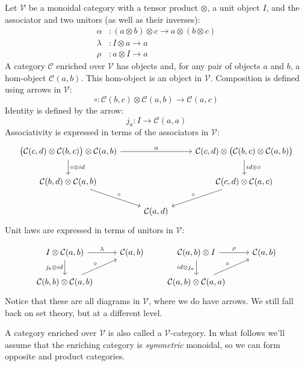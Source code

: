 \documentclass[DaoFP]{subfiles}
\begin{document}
Let $\mathcal V$ be a monoidal category with a tensor product $\otimes$, a unit object $I$, and the associator and two unitors (as well as their inverses):
\begin{align*}
\alpha &\colon (a \otimes b) \otimes c \to a \otimes (b \otimes c)
\\
 \lambda &\colon I \otimes a \to a
 \\
 \rho &\colon a \otimes I \to a
\end{align*}
A category $\mathcal C$ enriched over $\mathcal V$ has objects and, for any pair of objects $a$ and $b$, a hom-object $\mathcal C(a, b)$. This hom-object is an object in $\mathcal V$. Composition is defined using arrows in $\mathcal V$:
\[ \circ \colon \mathcal C (b, c) \otimes \mathcal C (a, b) \to \mathcal C (a, c) \]
Identity is defined by the arrow:
\[ j_a \colon I \to \mathcal C (a, a) \]
Associativity is expressed in terms of the associators in $\mathcal V$:
\[
 \begin{tikzcd}
 \big( \mathcal C (c, d) \otimes \mathcal C (b, c) \big) \otimes \mathcal C(a, b)
 \arrow[rr, "\alpha"]
 \arrow[d, "\circ \otimes id"]
 &&  \mathcal C (c, d) \otimes \big( \mathcal C (b, c) \otimes \mathcal C(a, b) \big) 
 \arrow[d, "id \otimes \circ"]
 \\
 \mathcal C(b, d) \otimes \mathcal C(a, b)
 \arrow[dr, "\circ"]
 && \mathcal C(c, d) \otimes \mathcal C(a, c)
 \arrow[dl, "\circ"']
 \\
 & \mathcal C(a, d)
 \end{tikzcd}
\]
Unit laws are expressed in terms of unitors in $\mathcal V$:

\[
 \begin{tikzcd}
 I \otimes \mathcal C(a, b)
 \arrow[r, "\lambda"]
 \arrow[d, "j_b \otimes id"']
 & \mathcal C(a, b)
 \\
 \mathcal C(b, b) \otimes \mathcal C(a, b)
 \arrow[ru, "\circ"]
 \end{tikzcd}
 \qquad
\begin{tikzcd}
\mathcal C(a, b) \otimes I
\arrow[r, "\rho"]
\arrow[d, "id \otimes j_a"']
& \mathcal C(a, b)
\\
\mathcal C(a, b) \otimes \mathcal C(a, a)
\arrow[ru, "\circ"]
 \end{tikzcd}
\]
Notice that these are all diagrams in $\mathcal V$, where we do have arrows. We still fall back on set theory, but at a different level.

A category enriched over $\mathcal V$ is also called a $\mathcal V$-category. In what follows we'll assume that the enriching category is \emph{symmetric} monoidal, so we can form opposite and product categories.
\end{document}
